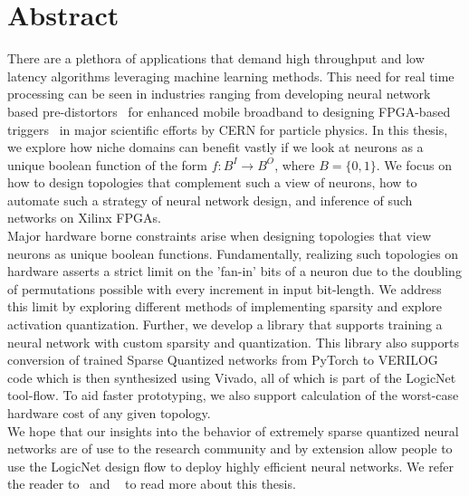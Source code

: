 \chapter*{Abstract}

There are a plethora of applications that demand high throughput and low latency algorithms leveraging machine learning methods. This need for real time processing can be seen in industries ranging from developing neural network based pre-distortors~\cite{tarver2019design} for enhanced mobile broadband to designing FPGA-based triggers~\cite{duarte2018fast} in major scientific efforts by CERN for particle physics. In this thesis, we explore how niche domains can benefit vastly if we look at neurons as a unique boolean function of the form $f:B^{I} \rightarrow B^{O}$, where $B = \{0,1\}$. We focus on how to design topologies that complement such a view of neurons, how to automate such a strategy of neural network design, and inference of such networks on Xilinx FPGAs.\\

Major hardware borne constraints arise when designing topologies that view neurons as unique boolean functions. Fundamentally, realizing such topologies on hardware asserts a strict limit on the 'fan-in' bits of a neuron due to the doubling of permutations possible with every increment in input bit-length. We address this limit by exploring different methods of implementing sparsity and explore activation quantization. Further, we develop a library that supports training a neural network with custom sparsity and quantization. This library also supports conversion of trained Sparse Quantized networks from PyTorch to VERILOG code which is then synthesized using Vivado, all of which is part of the LogicNet tool-flow. To aid faster prototyping, we also support calculation of the worst-case hardware cost of any given topology. \\

We hope that our insights into the behavior of extremely sparse quantized neural networks are of use to the research community and by extension allow people to use the LogicNet design flow to deploy highly efficient neural networks. We refer the reader to~\cite{umuroglu2020logicnets} and ~\cite{umuroglu2020logicnets_fccm} to read more about this thesis.




